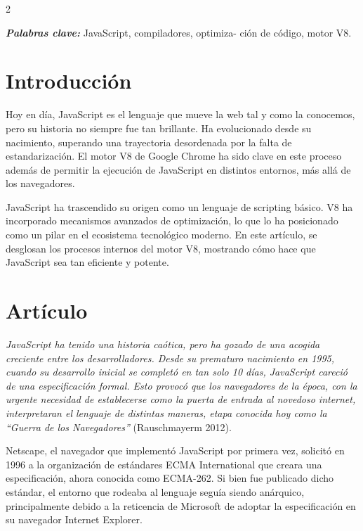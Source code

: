 \documentclass[12pt,spanish,Letterpaper,openany]{book}
\begin{document}
\begin {multicols}{2}

\textbf{\emph{Palabras clave:}} JavaScript, compiladores, optimiza-
ción de código, motor V8.

\hypertarget{introducciuxf3n-4}{%
\section{Introducción}\label{introducciuxf3n-4}}

Hoy en día, JavaScript es el lenguaje que mueve la web tal y como la conocemos, pero su historia no siempre fue tan brillante. Ha evolucionado desde su nacimiento, superando una trayectoria desordenada por la falta de estandarización. El motor V8 de Google Chrome ha sido clave en este proceso además de permitir la ejecución de JavaScript en distintos entornos, más allá de los navegadores.

JavaScript ha trascendido su origen como un lenguaje de scripting básico. V8 ha incorporado mecanismos avanzados de optimización, lo que lo ha posicionado como un pilar en el ecosistema tecnológico moderno. En este artículo, se desglosan los procesos internos del motor V8, mostrando cómo hace que JavaScript sea tan eficiente y potente.

\hypertarget{artuxedculo-4}{%
\section{Artículo}\label{artuxedculo-4}}

\emph{JavaScript ha tenido una historia caótica, pero ha gozado de una acogida creciente entre los desarrolladores. Desde su prematuro nacimiento en 1995, cuando su desarrollo inicial se completó en tan solo 10 días, JavaScript careció de una especificación formal. Esto provocó que los navegadores de la época, con la urgente necesidad de establecerse como la puerta de entrada al novedoso internet, interpretaran el lenguaje de distintas maneras, etapa conocida hoy como la ``Guerra de los Navegadores''} (Rauschmayerm 2012).

Netscape, el navegador que implementó JavaScript por primera vez, solicitó en 1996 a la organización de estándares ECMA International que creara una especificación, ahora conocida como ECMA-262. Si bien fue publicado dicho estándar, el entorno que rodeaba al lenguaje seguía siendo anárquico, principalmente debido a la reticencia de Microsoft de adoptar la especificación en su navegador Internet Explorer.


\end{multicols}
\end{document}
